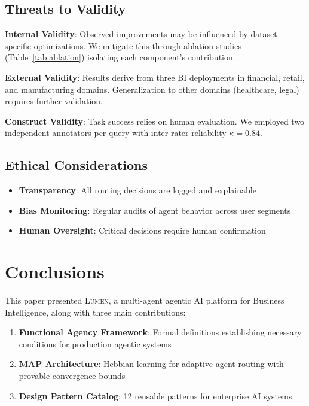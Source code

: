 \documentclass[11pt,a4paper]{article}
\theoremstyle{definition}
\theoremstyle{remark}
\newcommand{\lumen}{\textsc{Lumen}\xspace}
\newcommand{\map}{\textsc{MAP}\xspace}
\begin{document}
\subsection{Threats to Validity}

\textbf{Internal Validity}: Observed improvements may be influenced by dataset-specific optimizations. We mitigate this through ablation studies (Table~\ref{tab:ablation}) isolating each component's contribution.

\textbf{External Validity}: Results derive from three BI deployments in financial, retail, and manufacturing domains. Generalization to other domains (healthcare, legal) requires further validation.

\textbf{Construct Validity}: Task success relies on human evaluation. We employed two independent annotators per query with inter-rater reliability $\kappa = 0.84$.

\subsection{Ethical Considerations}

\begin{itemize}
    \item \textbf{Transparency}: All routing decisions are logged and explainable
    \item \textbf{Bias Monitoring}: Regular audits of agent behavior across user segments
    \item \textbf{Human Oversight}: Critical decisions require human confirmation
\end{itemize}


\section{Conclusions}
\label{sec:conclusions}

This paper presented \lumen, a multi-agent agentic AI platform for Business Intelligence, along with three main contributions:

\begin{enumerate}
    \item \textbf{Functional Agency Framework}: Formal definitions establishing necessary conditions for production agentic systems

    \item \textbf{\map Architecture}: Hebbian learning for adaptive agent routing with provable convergence bounds

    \item \textbf{Design Pattern Catalog}: 12 reusable patterns for enterprise AI systems
\end{enumerate}
\end{document}
